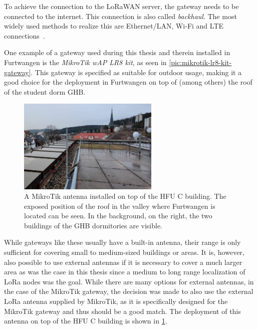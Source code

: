To achieve the connection to the \ac{LoRaWAN} server, the gateway needs to be connected to the internet.
This connection is also called \emph{backhaul}.
The most widely used methods to realize this are Ethernet/\ac{LAN}, Wi-Fi and \ac{LTE} connections~\cite{the_things_industries_bv_lorawan_nodate}.

One example of a gateway used during this thesis and therein installed in Furtwangen is the \emph{MikroTik wAP LR8 kit}, as seen in \cref{pic:mikrotik-lr8-kit-gateway}.
This gateway is specified as suitable for outdoor usage, making it a good choice for the deployment in Furtwangen on top of (among others) the roof of the student dorm \ac{GHB}.

\begin{figure}[htbp]
    \centering
    \includegraphics[width=0.6\textwidth]{pictures/hardware/gateway-deployment/mikrotik-antenna-c-building.jpg}
    \caption{
        A MikroTik antenna installed on top of the \ac{HFU} C building.
        The exposed position of the roof in the valley where Furtwangen is located can be seen.
        In the background, on the right, the two buildings of the \ac{GHB} dormitories are visible.
    }\label{pic:mikrotik-antenna-c-building}
\end{figure}

While gateways like these usually have a built-in antenna, their range is only sufficient for covering small to medium-sized buildings or areas.
It is, however, also possible to use external antennas if it is necessary to cover a much larger area as was the case in this thesis since a medium to long range localization of \ac{LoRa} nodes was the goal.
While there are many options for external antennas, in the case of the MikroTik gateway, the decision was made to also use the external \ac{LoRa} antenna supplied by MikroTik, as it is specifically designed for the MikroTik gateway and thus should be a good match.
The deployment of this antenna on top of the \ac{HFU} C building is shown in \cref{pic:mikrotik-antenna-c-building}.

